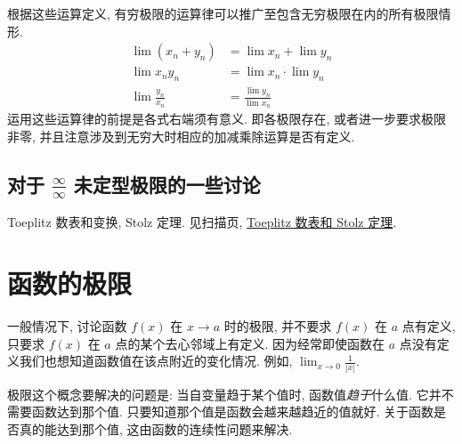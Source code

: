 \documentclass{book}
\newcommand{\abs}[1]{\left\lvert #1 \right\rvert}
\numberwithin{equation}{section}
\numberwithin{figure}{section}
\theoremstyle{definition}
\begin{document}
根据这些运算定义, 有穷极限的运算律可以推广至包含无穷极限在内的所有极限情形.
\begin{align*}
  \lim(x_n+y_n)&=\lim x_n+\lim y_n\\
  \lim x_ny_n&=\lim x_n\cdot\lim y_n\\
  \lim\frac{y_n}{x_n}&=\frac{\lim y_n}{\lim x_n}
\end{align*}
运用这些运算律的前提是各式右端须有意义. 即各极限存在, 或者进一步要求极限非零, 并且注意涉及到无穷大时相应的加减乘除运算是否有定义.

\subsection[对于 inf/inf 未定型极限的一些讨论]{对于 $\frac{\infty}{\infty}$ 未定型极限的一些讨论}
Toeplitz 数表和变换, Stolz 定理.
见扫描页, \hyperlink{scan:Toeplitz}{Toeplitz 数表和 Stolz 定理}.

\section{函数的极限}
一般情况下, 讨论函数 $f(x)$ 在 $x\to a$ 时的极限, 并不要求 $f(x)$ 在 $a$ 点有定义, 只要求 $f(x)$ 在 $a$ 点的某个去心邻域上有定义. 因为经常即使函数在 $a$ 点没有定义我们也想知道函数值在该点附近的变化情况. 例如, $\lim_{x\to 0}\frac{1}{\abs{x}}$.

极限这个概念要解决的问题是: 当自变量趋于某个值时, 函数值\emph{趋于}什么值. 它并不需要函数达到那个值. 只要知道那个值是函数会越来越趋近的值就好. 关于函数是否真的能达到那个值, 这由函数的连续性问题来解决.
\end{document}
